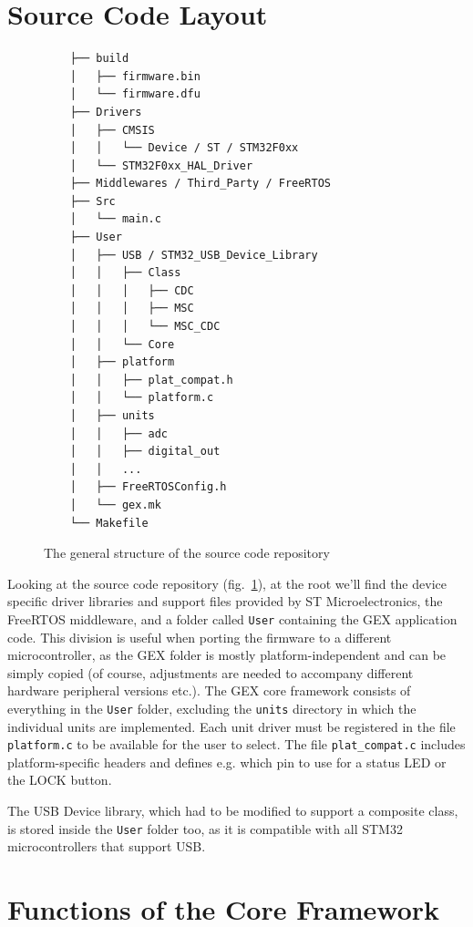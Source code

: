 \section{Source Code Layout}

\begin{figure}
	\scriptsize\vspace{-3em}
	\begin{verbatim}
	├── build
	│   ├── firmware.bin
	│   └── firmware.dfu
	├── Drivers
	│   ├── CMSIS
	│   │   └── Device / ST / STM32F0xx
	│   └── STM32F0xx_HAL_Driver
	├── Middlewares / Third_Party / FreeRTOS
	├── Src
	│   └── main.c
	├── User
	│   ├── USB / STM32_USB_Device_Library
	│   │   ├── Class
	│   │   │   ├── CDC
	│   │   │   ├── MSC
	│   │   │   └── MSC_CDC
	│   │   └── Core
	│   ├── platform
	│   │   ├── plat_compat.h
	│   │   └── platform.c
	│   ├── units
	│   │   ├── adc
	│   │   ├── digital_out
	│   │   ...
	│   ├── FreeRTOSConfig.h
	│   └── gex.mk
	└── Makefile
	\end{verbatim}
	\vspace{-1em}
	\caption{\label{fig:repo-structure} The general structure of the source code repository}
\end{figure}

Looking at the source code repository (fig.~\ref{fig:repo-structure}), at the root we'll find the device specific driver libraries and support files provided by ST Microelectronics, the FreeRTOS middleware, and a folder called \verb|User| containing the GEX application code. This division is useful when porting the firmware to a different microcontroller, as the GEX folder is mostly platform-independent and can be simply copied (of course, adjustments are needed to accompany different hardware peripheral versions etc.). The GEX core framework consists of everything in the \verb|User| folder, excluding the \verb|units| directory in which the individual units are implemented. Each unit driver must be registered in the file \verb|platform.c| to be available for the user to select. The file \verb|plat_compat.c| includes platform-specific headers and defines e.g. which pin to use for a status \gls{LED} or the LOCK button.

The \gls{USB} Device library, which had to be modified to support a composite class, is stored inside the \verb|User| folder too, as it is compatible with all STM32 microcontrollers that support \gls{USB}.


\section{Functions of the Core Framework}


